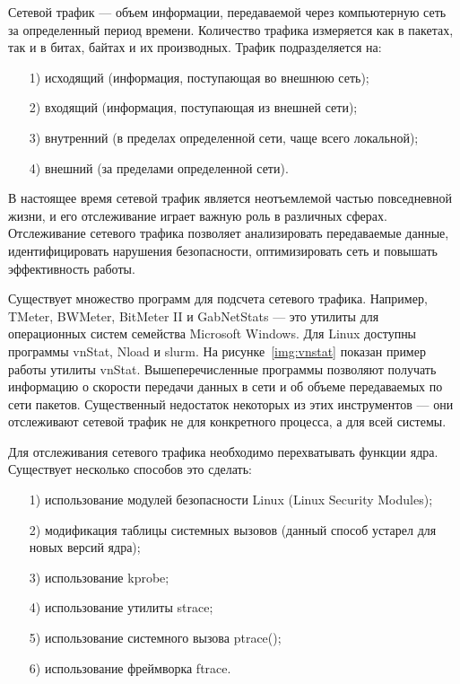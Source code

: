 \documentclass{bmstu}
\begin{document}
Сетевой трафик --- объем информации, передаваемой через компьютерную сеть за определенный период времени. 
Количество трафика измеряется как в пакетах, так и в битах, байтах и их производных. 
Трафик подразделяется на:
\begin{enumerate}
\item[1)] исходящий (информация, поступающая во внешнюю сеть);
\item[2)] входящий (информация, поступающая из внешней сети);
\item[3)] внутренний (в пределах определенной сети, чаще всего локальной);
\item[4)] внешний (за пределами определенной сети).
\end{enumerate}

В настоящее время сетевой трафик является неотъемлемой частью повседневной жизни, и его отслеживание играет важную роль в различных сферах. Отслеживание сетевого трафика позволяет анализировать передаваемые данные, идентифицировать нарушения безопасности, оптимизировать сеть и повышать эффективность работы.

Существует множество программ для подсчета сетевого трафика. 
Например, TMeter, BWMeter, BitMeter II и GabNetStats --- это утилиты для операционных систем семейства Microsoft Windows. 
Для Linux доступны программы vnStat, Nload и slurm. 
На рисунке~\ref{img:vnstat} показан пример работы утилиты vnStat.
Вышеперечисленные программы позволяют получать информацию о скорости передачи данных в сети и об объеме передаваемых по сети пакетов. 
Существенный недостаток некоторых из этих инструментов --- они отслеживают сетевой трафик не для конкретного процесса, а для всей системы.

Для отслеживания сетевого трафика необходимо перехватывать функции ядра. 
Существует несколько способов это сделать:
\begin{enumerate}
\item[1)] использование модулей безопасности Linux (Linux Security Modules);
\item[2)] модификация таблицы системных вызовов (данный способ устарел для новых версий ядра);
\item[3)] использование kprobe;
\item[4)] использование утилиты strace;
\item[5)] использование системного вызова ptrace();
\item[6)] использование фреймворка ftrace.
\end{enumerate}
\end{document}
